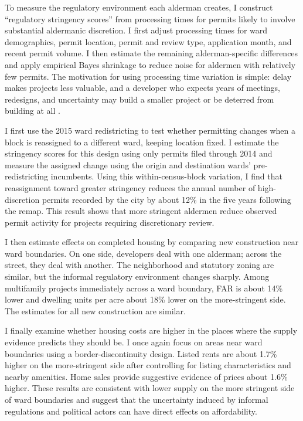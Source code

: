 To measure the regulatory environment each alderman creates, I construct ``regulatory stringency scores'' from processing times for permits likely to involve substantial aldermanic discretion.
I first adjust processing times for ward demographics, permit location, permit and review type, application month, and recent permit volume.
I then estimate the remaining alderman-specific differences and apply empirical Bayes shrinkage \citep{kline_systemic_2022, kline_discrimination_2024} to reduce noise for aldermen with relatively few permits.
The motivation for using processing time variation is simple: delay makes projects less valuable, and
a developer who expects years of meetings, redesigns, and uncertainty may build a smaller project or be deterred from building at all \citep{kydland_time_1982, mayer_land_2000, paciorek_supply_2013, gyourko_local_2021, soltas_how_2026}.

I first use the 2015 ward redistricting to test whether permitting changes when a block is reassigned to a different ward, keeping location fixed.
I estimate the stringency scores for this design using only permits filed through 2014 and measure the assigned change using the origin and destination wards' pre-redistricting incumbents.
Using this within-census-block variation, I find that reassignment toward greater stringency reduces the annual number of high-discretion permits recorded by the city by about 12\% in the five years following the remap.
This result shows that more stringent aldermen reduce observed permit activity for projects requiring discretionary review.

I then estimate effects on completed housing by comparing new construction near ward boundaries.
On one side, developers deal with one alderman; across the street, they deal with another.
The neighborhood and statutory zoning are similar, but the informal regulatory environment changes sharply.
Among multifamily projects immediately across a ward boundary, FAR is about 14\% lower and dwelling units per acre about 18\% lower on the more-stringent side.
The estimates for all new construction are similar.

I finally examine whether housing costs are higher in the places where the supply evidence predicts they should be.
I once again focus on areas near ward boundaries using a border-discontinuity design.
Listed rents are about 1.7\% higher on the more-stringent side after controlling for listing characteristics and nearby amenities.
Home sales provide suggestive evidence of prices about 1.6\% higher.
These results are consistent with lower supply on the more stringent side of ward boundaries and suggest that the uncertainty induced by informal regulations and political actors can have direct effects on affordability.

